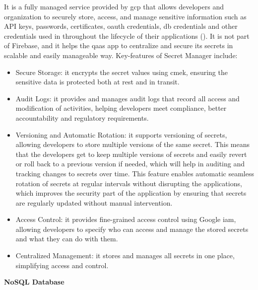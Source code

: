 \begin{multicols}{2}
      It is a fully managed service provided by \acrshort{gcp} that allows developers and organization to securely store,
      access, and manage sensitive information such as API keys, passwords, certificates, \acrshort{oauth} credentials,
      \acrshort{db} credentials and other credentials used in throughout the lifecycle of their applications
      (\cite{googlesecretmanager}). It is not part of Firebase, and it helps the \acrshort{qaas} app to centralize and
      secure its secrets in scalable and easily manageable way. Key-features of Secret Manager include:
      \begin{itemize}
            \item Secure Storage: it encrypts the secret values using \acrshort{cmek}, ensuring the sensitive data is protected
                  both at rest and in transit.
            \item Audit Logs: it provides and manages audit logs that record all access and modification of activities, helping
                  developers meet compliance, better accountability and regulatory requirements.
            \item Versioning and Automatic Rotation: it supports versioning of secrets, allowing developers to store multiple versions
                  of the same secret. This means that the developers get to keep multiple versions of secrets and easily revert or roll
                  back to a previous version if needed, which will help in auditing and tracking changes to secrets over time. This feature
                  enables automatic seamless rotation of secrets at regular intervals without  disrupting the applications, which improves
                  the security part of the application by ensuring that secrets are regularly updated without manual intervention.
            \item Access Control: it provides fine-grained access control using Google \acrshort{iam}, allowing developers to specify
                  who can access and manage the stored secrets and what they can do with them.
            \item Centralized Management: it stores and manages all secrets in one place, simplifying access and control.
      \end{itemize}

      \textbf{NoSQL Database}


\end{multicols}
